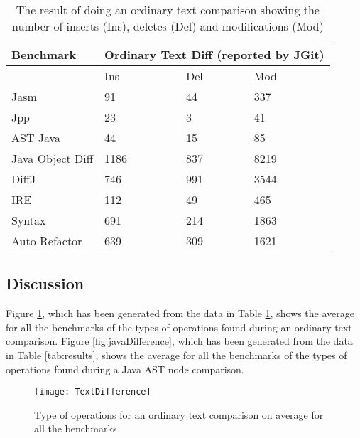 \begin{table}[!p]
    \centering
    \begin{tabular}{l|lll}
    Benchmark        & \multicolumn{3}{|c}{Ordinary Text Diff (reported by JGit)} \\ \hline
    ~                & Ins            & Del & Mod  \\ \hline
    Jasm             & 91             & 44  & 337  \\
    Jpp              & 23             & 3   & 41   \\
    AST Java         & 44             & 15  & 85   \\
    Java Object Diff & 1186           & 837 & 8219 \\
    DiffJ            & 746            & 991 & 3544 \\
    IRE              & 112            & 49  & 465  \\
    Syntax           & 691            & 214 & 1863 \\
    Auto Refactor    & 639            & 309 & 1621 \\
    \end{tabular}
    \caption{The result of doing an ordinary text comparison showing the number of inserts (Ins), deletes (Del) and modifications (Mod)}
    \label{tab:textcomp}
\end{table}



  
\subsection{Discussion}
Figure \ref{fig:textDifference}, which has been generated from the data in Table \ref{tab:textcomp}, shows the average for all the benchmarks of the types of operations found during an ordinary text comparison.  
Figure \ref{fig:javaDifference}, which has been generated from the data in Table \ref{tab:results}, shows the average for all the benchmarks of the types of operations found during a Java AST node comparison.

\begin{figure}[p] 
 \begin{center}
 \texttt{[image: TextDifference]}
 \end{center}
 \caption{Type of operations for an ordinary text comparison on average for all the benchmarks}
 \label{fig:textDifference}
\end{figure}

